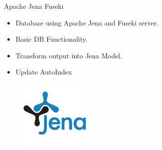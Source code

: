 \begin{frame}{Apache Jena Fuseki}
	\begin{itemize}
		\item Database using Apache Jena and Fuseki server.
		\item Basic DB Functionality.
		\item Transform output into Jena Model.
		\item Update AutoIndex
	\end{itemize}
	\begin{figure}[htbp]
  		\centering
  		\includegraphics[width=0.3\textwidth]{figures/jena}
	\end{figure}
\end{frame}